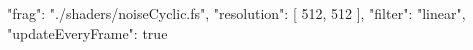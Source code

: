 {
	"frag": "./shaders/noiseCyclic.fs",
	"resolution": [
		512,
		512
	],
	"filter": "linear",
	"updateEveryFrame": true
}
